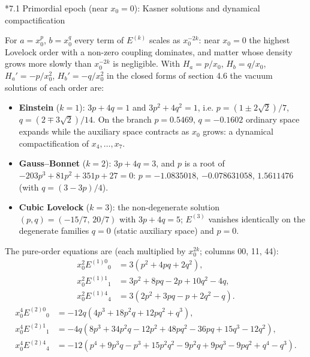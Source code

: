 \documentclass[10pt,a4paper]{article}
\makeatletter
\renewcommand\subsection{\@startsection{subsection}{2}{\z@}{-3.25ex\@plus -1ex \@minus -.2ex}{1.5ex \@plus .2ex}{\normalfont\large\bfseries\raggedright}}
\makeatother
\begin{document}
\subsection*{7.1 Primordial epoch (near \texorpdfstring{$x_0=0$}{x0=0}): Kasner solutions and dynamical compactification}
For $a=x_0^{p}$, $b=x_0^{q}$ every term of $E^{(k)}$ scales as $x_0^{-2k}$: near $x_0=0$ the highest Lovelock order with a non-zero coupling dominates, and matter whose density grows more slowly than $x_0^{-2k}$ is negligible. With $H_a=p/x_0$, $H_b=q/x_0$, $H_a'=-p/x_0^2$, $H_b'=-q/x_0^2$ in the closed forms of section 4.6 the vacuum solutions of each order are:

\begin{itemize}
\item \textbf{Einstein} ($k=1$): $3p+4q=1$ and $3p^2+4q^2=1$, i.e. $p=(1\pm2\sqrt2)/7$, $q=(2\mp3\sqrt2)/14$. On the branch $p=0.5469$, $q=-0.1602$ ordinary space expands while the auxiliary space contracts as $x_0$ grows: a dynamical compactification of $x_4,\dots,x_7$.
\item \textbf{Gauss–Bonnet} ($k=2$): $3p+4q=3$, and $p$ is a root of $-203p^3+81p^2+351p+27=0$: $p=-1.0835018$, $-0.078631058$, $1.5611476$ (with $q=(3-3p)/4$).
\item \textbf{Cubic Lovelock} ($k=3$): the non-degenerate solution $(p,q)=(-15/7,\,20/7)$ with $3p+4q=5$; $E^{(3)}$ vanishes identically on the degenerate families $q=0$ (static auxiliary space) and $p=0$.
\end{itemize}
The pure-order equations are (each multiplied by $x_0^{2k}$; columns 00, 11, 44):
\begin{align*}
x_0^{2}E^{(1)0}{}_0&=3 \left(p^{2} + 4 p q + 2 q^{2}\right), \\
x_0^{2}E^{(1)1}{}_1&=3 p^{2} + 8 p q - 2 p + 10 q^{2} - 4 q, \\
x_0^{2}E^{(1)4}{}_4&=3 \left(2 p^{2} + 3 p q - p + 2 q^{2} - q\right).
\end{align*}
\begin{align*}
x_0^{4}E^{(2)0}{}_0&=- 12 q \left(4 p^{3} + 18 p^{2} q + 12 p q^{2} + q^{3}\right), \\
x_0^{4}E^{(2)1}{}_1&=- 4 q \left(8 p^{3} + 34 p^{2} q - 12 p^{2} + 48 p q^{2} - 36 p q + 15 q^{3} - 12 q^{2}\right), \\
x_0^{4}E^{(2)4}{}_4&=- 12 \left(p^{4} + 9 p^{3} q - p^{3} + 15 p^{2} q^{2} - 9 p^{2} q + 9 p q^{3} - 9 p q^{2} + q^{4} - q^{3}\right).
\end{align*}
\end{document}
